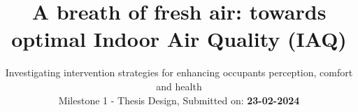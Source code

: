 \title{A breath of fresh air: towards optimal Indoor Air Quality (IAQ)}
\subtitle{Investigating intervention strategies for enhancing occupants perception, comfort and health\\ Milestone 1 - Thesis Design, Submitted on: \textbf{23-02-2024}}
